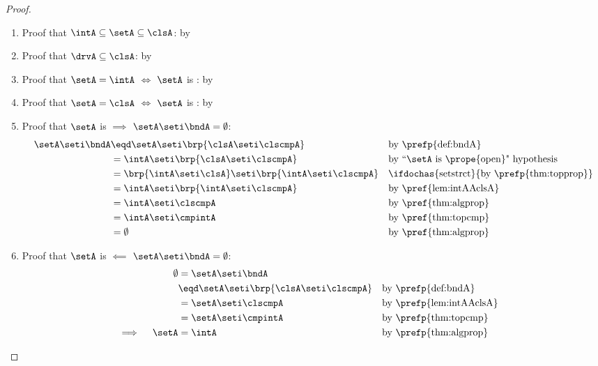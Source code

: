 \begin{proof}
\begin{enumerate}
  \item Proof that $\intA\subseteq\setA\subseteq\clsA$: by 
  \item Proof that $\drvA\subseteq\clsA$:  by 
  \item Proof that $\setA=\intA$ $\iff$ $\setA$ is : by 
  \item Proof that $\setA=\clsA$ $\iff$ $\setA$ is : by 
  \item Proof that $\setA$ is    $\implies$ $\setA\seti\bndA=\emptyset$:
    \begin{align*}
      \setA\seti\bndA
        &\eqd \setA\seti\brp{\clsA\seti\clscmpA}
        &&    \text{by \prefp{def:bndA}}
      \\&=    \intA\seti\brp{\clsA\seti\clscmpA}
        &&    \text{by ``$\setA$ is \prope{open}" hypothesis}
      \\&=    \brp{\intA\seti\clsA} \seti \brp{\intA\seti\clscmpA}
        && \text{\ifdochas{setstrct}{by \prefp{thm:topprop}}}
      \\&=    \intA \seti \brp{\intA\seti\clscmpA}
        &&    \text{by \pref{lem:intAAclsA}}
      \\&=    \intA \seti\clscmpA
        &&    \text{by \pref{thm:algprop}}
      \\&=    \intA \seti\cmpintA
        &&    \text{by \pref{thm:topcmp}}
      \\&=    \emptyset
        &&    \text{by \pref{thm:algprop}}
    \end{align*}

  \item Proof that $\setA$ is    $\impliedby$ $\setA\seti\bndA=\emptyset$:
    \begin{align*}
      \emptyset
        &=    \setA\seti\bndA
      \\&\eqd \setA\seti\brp{\clsA\seti\clscmpA}
        &&    \text{by \prefp{def:bndA}}
      \\&=    \setA\seti\clscmpA
        &&    \text{by \prefp{lem:intAAclsA}}
      \\&=    \setA\seti\cmpintA
        &&    \text{by \prefp{thm:topcmp}}
      \\
      \implies\quad \setA
        &=    \intA
        &&    \text{by \prefp{thm:algprop}}
    \end{align*}


\end{enumerate}
\end{proof}

